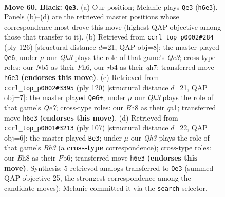 \documentclass[11pt]{article}
\begin{document}
\clearpage

\begin{figure}[p]\centering
\begin{subfigure}{0.46\textwidth}\centering
\resizebox{\linewidth}{!}{%
\newchessgame
\chessboard[
  setfen={5k1b/5p2/7q/1n1P4/1R6/8/8/5K2 b - - 7 60},
  showmover=false,
  pgfstyle=straightmove, color=movearrow, markmove={h6-e3}
]}
\caption{}
\end{subfigure}\hfill
\begin{subfigure}{0.46\textwidth}\centering
\resizebox{\linewidth}{!}{%
\newchessgame
\chessboard[
  setfen={8/7q/7P/8/1p5k/4Q3/3K4/8 w - - 15 64},
  showmover=false,
  pgfstyle=straightmove, color=movearrow, markmove={e3-e6}
]}
\caption{}
\end{subfigure}
\\[4pt]
\begin{subfigure}{0.46\textwidth}\centering
\resizebox{\linewidth}{!}{%
\newchessgame
\chessboard[
  setfen={6k1/4Q3/1p6/1N6/8/5PK1/1r6/q7 w - - 23 61},
  showmover=false,
  pgfstyle=straightmove, color=movearrow, markmove={e7-e6}
]}
\caption{}
\end{subfigure}\hfill
\begin{subfigure}{0.46\textwidth}\centering
\resizebox{\linewidth}{!}{%
\newchessgame
\chessboard[
  setfen={8/8/1p5b/5k2/K5nP/8/1P6/6R1 b - - 2 54},
  showmover=false,
  pgfstyle=straightmove, color=movearrow, markmove={h6-e3}
]}
\caption{}
\end{subfigure}
\caption{\textbf{Move 60, Black: \texttt{Qe3}.} (a) Our position; Melanie plays \texttt{Qe3} (\texttt{h6e3}). Panels (b)--(d) are the retrieved master positions whose correspondence most drove this move (highest QAP objective among those that transfer to it). (b) Retrieved from \texttt{ccrl\_top\_p0002\#284} (ply 126) [structural distance $d$=21, QAP obj=8]: the master played \texttt{Qe6}; under $\mu$ our \emph{Qh3} plays the role of that game's \emph{Qe3}; cross-type roles: our \emph{N}b5 as their \emph{P}h6, our \emph{r}b4 as their \emph{q}h7; transferred move \texttt{h6e3} \textbf{(endorses this move)}. (c) Retrieved from \texttt{ccrl\_top\_p0002\#3395} (ply 120) [structural distance $d$=21, QAP obj=7]: the master played \texttt{Qe6+}; under $\mu$ our \emph{Qh3} plays the role of that game's \emph{Qe7}; cross-type roles: our \emph{B}h8 as their \emph{q}a1; transferred move \texttt{h6e3} \textbf{(endorses this move)}. (d) Retrieved from \texttt{ccrl\_top\_p0001\#3213} (ply 107) [structural distance $d$=22, QAP obj=6]: the master played \texttt{Be3}; under $\mu$ our \emph{Qh3} plays the role of that game's \emph{Bh3} (a \textbf{cross-type} correspondence); cross-type roles: our \emph{B}h8 as their \emph{P}b6; transferred move \texttt{h6e3} \textbf{(endorses this move)}. Synthesis: 5 retrieved analogs transferred to \texttt{Qe3} (summed QAP objective 25, the strongest correspondence among the candidate moves); Melanie committed it via the \texttt{search} selector.}
\label{fig:thought-m119}
\end{figure}
\end{document}

